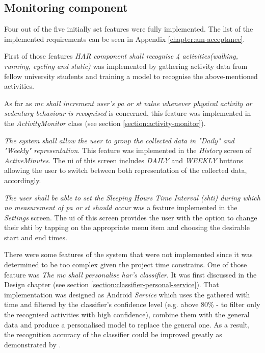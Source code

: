 \subsection{Monitoring component}
Four out of the five initially set features were fully implemented. The list of the implemented requirements can be seen in Appendix \ref{chapter:am-acceptance}.

First of those features \textit{HAR component shall recognise 4 activities(walking, running, cycling and static)} was implemented by gathering activity data from fellow university students and training a model to recognise the above-mentioned activities.

As far as \textit{\gls{mc} shall increment user's \gls{pa} or \gls{st} value whenever physical activity or sedentary behaviour is recognised} is concerned, this feature was implemented in the \textit{ActivityMonitor} class (see section \ref{section:activity-monitor}).

\textit{The system shall allow the user to group the collected data in "Daily" and "Weekly" representation}. This feature was implemented in the \textit{History} screen of \textit{ActiveMinutes}. The \gls{ui} of this screen includes \textit{DAILY} and \textit{WEEKLY} buttons allowing the user to switch between both representation of the collected data, accordingly.

\textit{The user shall be able to set the \textit{Sleeping Hours Time Interval} (\gls{shti}) during which no measurement of \gls{pa} or \gls{st} should occur} was a feature implemented in the \textit{Settings} screen. The \gls{ui} of this screen provides the user with the option to change their \gls{shti} by tapping on the appropriate menu item and choosing the desirable start and end times.

There were some features of the system that were not implemented since it was determined to be too complex given the project time constrains. One of those feature was \textit{The \gls{mc} shall personalise \gls{har}'s classifier}. It was first discussed in the Design chapter (see section \ref{section:classifier-personal-service}). That implementation was designed as Android \textit{Service} which uses the gathered with time and filtered by the classifier's confidence level (e.g. above 80\% - to filter only the recognised activities with high confidence), combine them with the general data and produce a personalised model to replace the general one. As a result, the recognition accuracy of the classifier could be improved greatly as demonstrated by \citet[376]{arapakis_athanasakos_jose_2010}.

